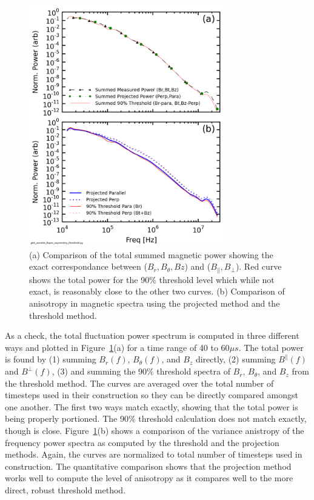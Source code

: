 \documentclass[aip,prl,amsmath,amssymb,reprint,superscriptaddress]{revtex4-1} %
\begin{document}
\begin{figure}[!htbp]
\centerline{
\includegraphics[width=8.5cm]{Bperppara_spectra_thresholdvsprojection40t60us}}
\caption{\label{fig:powercomparison} (a) Comparison of the total summed magnetic power showing the exact correspondance between ($B_{r},B_{\theta},B{z}$) and ($B_{\parallel},B_{\perp}$). Red curve shows the total power for the 90$\%$ threshold level which while not exact, is reasonably close to the other two curves. (b) Comparison of anisotropy in magnetic spectra using the projected method and the threshold method.}
\end{figure}

As a check, the total fluctuation power spectrum is computed in three different ways and plotted in Figure~\ref{fig:powercomparison}(a) for a time range of 40 to 60$\mu s$. The total power is found by (1) summing $B_{r}(f)$, $B_{\theta}(f)$, and $B_{z}$ directly, (2) summing $B^{\parallel}(f)$ and $B^{\perp}(f)$, (3) and summing the 90\% threshold spectra of $B_{r}$, $B_{\theta}$, and $B_{z}$ from the threshold method. The curves are averaged over the total number of timesteps used in their construction so they can be directly compared amongst one another. The first two ways match exactly, showing that the total power is being properly portioned. The 90\% threshold calculation does not match exactly, though is close. Figure~\ref{fig:powercomparison}(b) shows a comparison of the variance anistropy of the frequency power spectra as computed by the threshold and the projection methods. Again, the curves are normalized to total number of timesteps used in construction. The quantitative comparison shows that the projection method works well to compute the level of anisotropy as it compares well to the more direct, robust threshold method.
\end{document}
